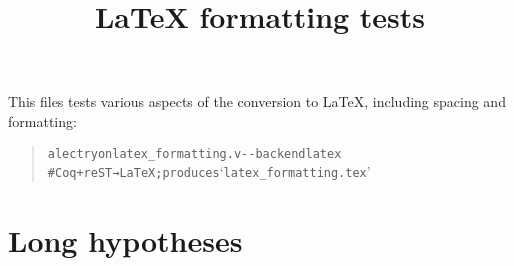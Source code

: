 \documentclass[a4paper]{article}
\begin{document}
\title{LaTeX formatting tests%
  \label{latex-formatting-tests}}
\author{}
\date{}
\maketitle

This files tests various aspects of the conversion to LaTeX, including spacing and formatting:

\begin{quote}
\begin{alltt}
alectryon latex_formatting.v -{}-backend latex
  # Coq+reST → LaTeX; produces ‘latex_formatting.tex’
\end{alltt}
\end{quote}


\section{Long hypotheses%
  \label{long-hypotheses}%
}
\end{document}
